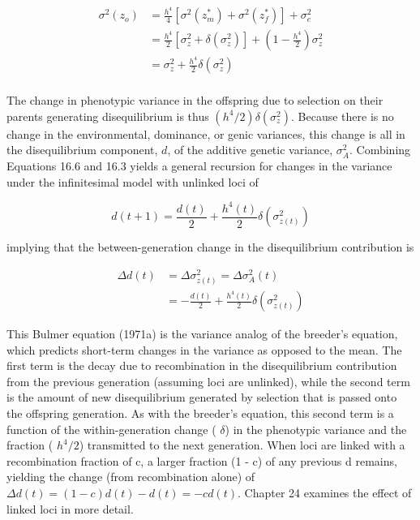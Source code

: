 \documentclass{article}
\begin{document}
\begin{equation}
\begin{aligned}\sigma^{2}(z_{o})&=\frac{h^{4}}{4}\left[\sigma^{2}(z_{m}^{*})+\sigma^{2}(z_{f}^{*})\right]+\sigma_{e}^{2}\\&=\frac{h^{4}}{2}\left[\sigma_{z}^{2}+\delta(\sigma_{z}^{2})\right]+\left(1-\frac{h^{4}}{2}\right)\sigma_{z}^{2}\\&=\sigma_{z}^{2}+\frac{h^{4}}{2}\delta\left(\sigma_{z}^{2}\right)\\ \end{aligned}
\tag{16.6}
\label{eq:16_6}
\end{equation}

The change in phenotypic variance in the offspring due to selection on their parents generating disequilibrium is thus  $ (h^4/2)\delta(\sigma_z^2) $. Because there is no change in the environmental, dominance, or genic variances, this change is all in the disequilibrium component,  $ d $, of the additive genetic variance,  $ \sigma_A^2 $. Combining Equations 16.6 and 16.3 yields a general recursion for changes in the variance under the infinitesimal model with unlinked loci of

\begin{equation}
d(t+1)=\frac{d(t)}{2}+\frac{h^{4}(t)}{2}\delta\left(\sigma_{z(t)}^{2}\right)
\tag{16.7a}
\label{eq:16_7a}
\end{equation}

implying that the between-generation change in the disequilibrium contribution is

\begin{equation}
\begin{aligned}\Delta d(t)&=\Delta\sigma_{z(t)}^{2}=\Delta\sigma_{A}^{2}(t)\\&=-\frac{d(t)}{2}+\frac{h^{4}(t)}{2}\delta\left(\sigma_{z(t)}^{2}\right)\end{aligned}
\tag{16.7b}
\label{eq:16_7b}
\end{equation}

This Bulmer equation (1971a) is the variance analog of the breeder’s equation, which predicts short-term changes in the variance as opposed to the mean. The first term is the decay due to recombination in the disequilibrium contribution from the previous generation (assuming loci are unlinked), while the second term is the amount of new disequilibrium generated by selection that is passed onto the offspring generation. As with the breeder’s equation, this second term is a function of the within-generation change ( $ \delta $) in the phenotypic variance and the fraction ( $ h^{4}/2 $) transmitted to the next generation. When loci are linked with a recombination fraction of c, a larger fraction (1 - c) of any previous d remains, yielding the change (from recombination alone) of  $ \Delta d(t) = (1 - c)d(t) - d(t) = -cd(t) $. Chapter 24 examines the effect of linked loci in more detail.
\end{document}
